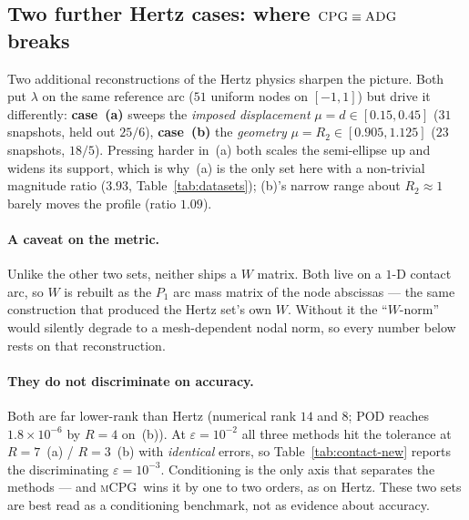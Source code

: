 \documentclass[11pt]{article}
\newcommand{\CPG}{\textsc{CPG}}
\newcommand{\ADG}{\textsc{ADG}}
\newcommand{\mCPG}{\textsc{mCPG}}
\begin{document}
\subsection{Two further Hertz cases: where \texorpdfstring{$\CPG\equiv\ADG$}{CPG=ADG} breaks}
\label{sec:contact-new}

Two additional reconstructions of the Hertz physics sharpen the picture. Both put
$\lambda$ on the same reference arc ($51$ uniform nodes on $[-1,1]$) but drive it
differently: \textbf{case~(a)} sweeps the \emph{imposed displacement}
$\mu=d\in[0.15,0.45]$ ($31$ snapshots, held out $25/6$), \textbf{case~(b)} the
\emph{geometry} $\mu=R_2\in[0.905,1.125]$ ($23$ snapshots, $18/5$). Pressing harder
in~(a) both scales the semi-ellipse up and widens its support, which is why~(a) is
the only set here with a non-trivial magnitude ratio ($3.93$,
Table~\ref{tab:datasets}); (b)'s narrow range about $R_2\approx1$ barely moves the
profile (ratio $1.09$).

\paragraph{A caveat on the metric.}
Unlike the other two sets, neither ships a $W$ matrix. Both live on a $1$-D contact
arc, so $W$ is rebuilt as the $P_1$ arc mass matrix of the node abscissas --- the
same construction that produced the Hertz set's own $W$. Without it the ``$W$-norm''
would silently degrade to a mesh-dependent nodal norm, so every number below rests
on that reconstruction.

\paragraph{They do not discriminate on accuracy.}
Both are far lower-rank than Hertz (numerical rank $14$ and $8$; POD reaches
$1.8\times10^{-6}$ by $R=4$ on~(b)). At $\varepsilon=10^{-2}$ all three methods hit
the tolerance at $R=7$~(a) / $R=3$~(b) with \emph{identical} errors, so
Table~\ref{tab:contact-new} reports the discriminating $\varepsilon=10^{-3}$.
Conditioning is the only axis that separates the methods --- and \mCPG\ wins it by
one to two orders, as on Hertz. These two sets are best read as a conditioning
benchmark, not as evidence about accuracy.
\end{document}
